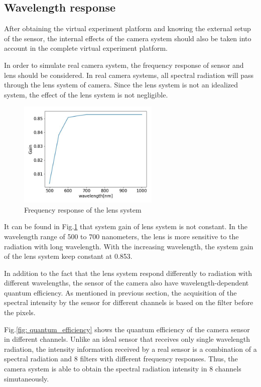 \subsection{Wavelength response}
After obtaining the virtual experiment platform and knowing the external setup of the 
sensor, the internal effects of the camera system should also be taken into account 
in the complete virtual experiment platform.


In order to simulate real camera system, the frequency response of sensor and lens 
should be considered. In real camera systems, all spectral radiation will 
pass through the lens system of camera. Since the lens system is not an 
idealized system, the effect of the lens system is not negligible. 

\begin{figure}[htbp]
    \centering
    \includegraphics[width=0.6\textwidth]{figures/tr_frequency_response.jpg}
    \caption{Frequency response of the lens system}
    \label{fig: frequency_response_lens}
\end{figure}


It can be found in Fig.\ref{fig: frequency_response_lens} that system gain 
of lens system is not constant. In the wavelength range of 500 to 700 nanometers, 
the lens is more sensitive to the radiation with long wavelength. With the 
increasing wavelength, the system gain of the lens system keep constant at 0.853.


In addition to the fact that the lens system respond differently to radiation
with different wavelengths, the sensor of the camera also have wavelength-dependent quantum 
efficiency. As mentioned in previous section, the acquisition of the spectral 
intensity by the sensor for different channels is based on the filter 
before the pixels. 


Fig.\ref{fig: quantum_efficiency} shows the quantum efficiency 
of the camera sensor in different channels. Unlike an ideal sensor that 
receives only single wavelength radiation, the intensity information received 
by a real sensor is a combination of a spectral radiation and 8 filters with 
different frequency responses. Thus, the camera system is able to obtain the 
spectral radiation intensity in 8 channels simutaneously. 


